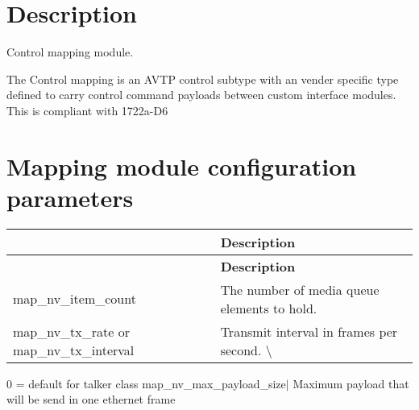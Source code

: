 \section*{Description}

Control mapping module.

The Control mapping is an A\+V\+TP control subtype with an vender specific type defined to carry control command payloads between custom interface modules. This is compliant with 1722a-\/\+D6

\section*{Mapping module configuration parameters}

\tabulinesep=1mm
\begin{longtabu} spread 0pt [c]{*2{|X[-1]}|}
\hline
{}&{\bf Description  }\\
\endfirsthead
\hline
\endfoot
\hline
{}&{\bf Description  }\\
\endhead
map\+\_\+nv\+\_\+item\+\_\+count &The number of media queue elements to hold. \\
map\+\_\+nv\+\_\+tx\+\_\+rate or map\+\_\+nv\+\_\+tx\+\_\+interval &Transmit interval in frames per second. \textbackslash{} \\
\end{longtabu}
0 = default for talker class map\+\_\+nv\+\_\+max\+\_\+payload\+\_\+size$\vert$ Maximum payload that will be send in one ethernet frame 
